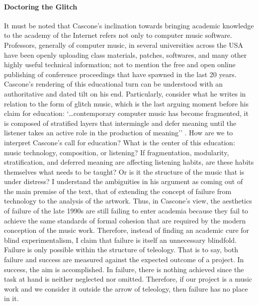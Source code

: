 \paragraph{Doctoring the Glitch}
It must be noted that Cascone's inclination towards bringing academic knowledge to the academy of the Internet refers not only to computer music software. Professors, generally of computer music, in several universities across the USA have been openly uploading class materials, patches, softwares, and many other highly useful technical information; not to mention the free and open online publishing of conference proceedings that have spawned in the last 20 years. Cascone's rendering of this educational turn can be understood with an authoritative and dated tilt on his end. Particularly, consider what he writes in relation to the form of glitch music, which is the last arguing moment before his claim for education: `\dots contemporary computer music has become fragmented, it is composed of stratified layers that intermingle and defer meaning until the listener takes an active role in the production of meaning'' \parencite[17]{Cas00:The}. How are we to interpret Cascone's call for education? What is the center of this education: music technology, composition, or listening? If fragmentation, modularity, stratification, and deferred meaning are affecting listening habits, are these habits themselves what needs to be taught? Or is it the structure of the music that is under distress? I understand the ambiguities in his argument as coming out of the main premise of the text, that of extending the concept of failure from technology to the analysis of the artwork. Thus, in Cascone's view, the aesthetics of failure of the late 1990s are still failing to enter academia because they fail to achieve the same standards of formal cohesion that are required by the modern conception of the music work. Therefore, instead of finding an academic cure for blind experimentalism, I claim that failure is itself an unnecessary blindfold. Failure is only possible within the structure of teleology. That is to say, both failure and success are measured against the expected outcome of a project. In success, the aim is accomplished. In failure, there is nothing achieved since the task at hand is neither neglected nor omitted. Therefore, if our project is a music work and we consider it outside the arrow of teleology, then failure has no place in it.  

